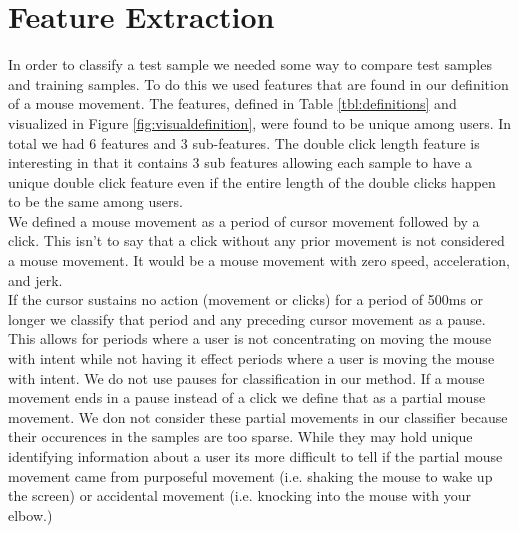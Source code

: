 \documentclass[conference]{IEEEtran}
\begin{document}
\bgroup
\def\arraystretch{1.5}
\egroup
{}


\section{Feature Extraction}
    In order to classify a test sample we needed some way to compare test samples and training samples. To do this we used features that are found in our definition of a mouse movement. The features, defined in Table \ref{tbl:definitions} and visualized in Figure \ref{fig:visualdefinition}, were found to be unique among users. In total we had 6 features and 3 sub-features. The double click length feature is interesting in that it contains 3 sub features allowing each sample to have a unique double click feature even if the entire length of the double clicks happen to be the same among users.\\
	We defined a mouse movement as a period of cursor movement followed by a click. This isn't to say that a click without any prior movement is not considered a mouse movement. It would be a mouse movement with zero speed, acceleration, and jerk. \\
	If the cursor sustains no action (movement or clicks) for a period of 500ms or longer we classify that period and any preceding cursor movement as a pause. This allows for periods where a user is not concentrating on moving the mouse with intent while not having it effect periods where a user is moving the mouse with intent. We do not use pauses for classification in our method. If a mouse movement ends in a pause instead of a click we define that as a partial mouse movement. We don not consider these partial movements in our classifier because their occurences in the samples are too sparse. While they may hold unique identifying information about a user its more difficult to tell if the partial mouse movement came from purposeful movement (i.e. shaking the mouse to wake up the screen) or accidental movement (i.e. knocking into the mouse with your elbow.)
\end{document}
